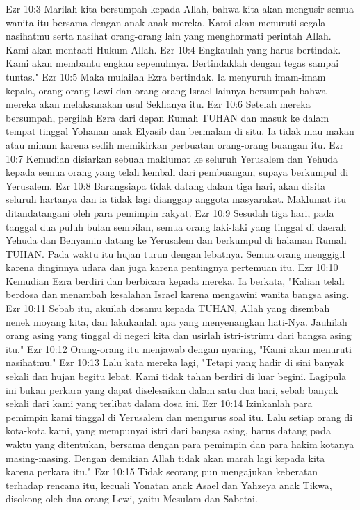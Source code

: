 Ezr 10:3  Marilah kita bersumpah kepada Allah, bahwa kita akan mengusir semua wanita itu bersama dengan anak-anak mereka. Kami akan menuruti segala nasihatmu serta nasihat orang-orang lain yang menghormati perintah Allah. Kami akan mentaati Hukum Allah.
Ezr 10:4  Engkaulah yang harus bertindak. Kami akan membantu engkau sepenuhnya. Bertindaklah dengan tegas sampai tuntas."
Ezr 10:5  Maka mulailah Ezra bertindak. Ia menyuruh imam-imam kepala, orang-orang Lewi dan orang-orang Israel lainnya bersumpah bahwa mereka akan melaksanakan usul Sekhanya itu.
Ezr 10:6  Setelah mereka bersumpah, pergilah Ezra dari depan Rumah TUHAN dan masuk ke dalam tempat tinggal Yohanan anak Elyasib dan bermalam di situ. Ia tidak mau makan atau minum karena sedih memikirkan perbuatan orang-orang buangan itu.
Ezr 10:7  Kemudian disiarkan sebuah maklumat ke seluruh Yerusalem dan Yehuda kepada semua orang yang telah kembali dari pembuangan, supaya berkumpul di Yerusalem.
Ezr 10:8  Barangsiapa tidak datang dalam tiga hari, akan disita seluruh hartanya dan ia tidak lagi dianggap anggota masyarakat. Maklumat itu ditandatangani oleh para pemimpin rakyat.
Ezr 10:9  Sesudah tiga hari, pada tanggal dua puluh bulan sembilan, semua orang laki-laki yang tinggal di daerah Yehuda dan Benyamin datang ke Yerusalem dan berkumpul di halaman Rumah TUHAN. Pada waktu itu hujan turun dengan lebatnya. Semua orang menggigil karena dinginnya udara dan juga karena pentingnya pertemuan itu.
Ezr 10:10  Kemudian Ezra berdiri dan berbicara kepada mereka. Ia berkata, "Kalian telah berdosa dan menambah kesalahan Israel karena mengawini wanita bangsa asing.
Ezr 10:11  Sebab itu, akuilah dosamu kepada TUHAN, Allah yang disembah nenek moyang kita, dan lakukanlah apa yang menyenangkan hati-Nya. Jauhilah orang asing yang tinggal di negeri kita dan usirlah istri-istrimu dari bangsa asing itu."
Ezr 10:12  Orang-orang itu menjawab dengan nyaring, "Kami akan menuruti nasihatmu."
Ezr 10:13  Lalu kata mereka lagi, "Tetapi yang hadir di sini banyak sekali dan hujan begitu lebat. Kami tidak tahan berdiri di luar begini. Lagipula ini bukan perkara yang dapat diselesaikan dalam satu dua hari, sebab banyak sekali dari kami yang terlibat dalam dosa ini.
Ezr 10:14  Izinkanlah para pemimpin kami tinggal di Yerusalem dan mengurus soal itu. Lalu setiap orang di kota-kota kami, yang mempunyai istri dari bangsa asing, harus datang pada waktu yang ditentukan, bersama dengan para pemimpin dan para hakim kotanya masing-masing. Dengan demikian Allah tidak akan marah lagi kepada kita karena perkara itu."
Ezr 10:15  Tidak seorang pun mengajukan keberatan terhadap rencana itu, kecuali Yonatan anak Asael dan Yahzeya anak Tikwa, disokong oleh dua orang Lewi, yaitu Mesulam dan Sabetai.

